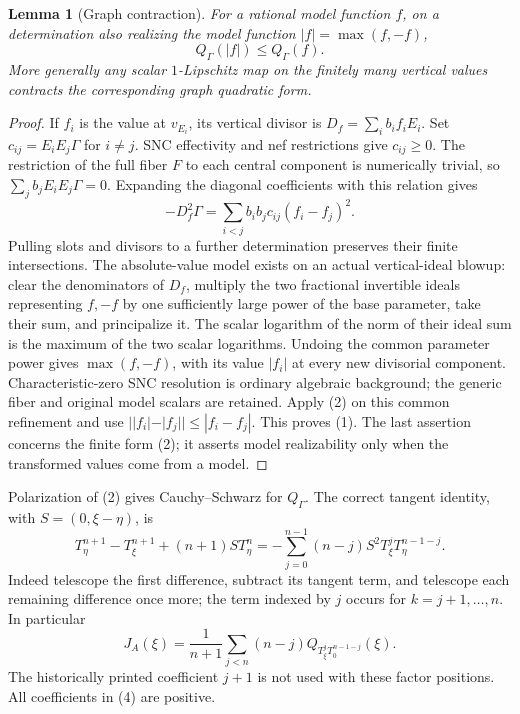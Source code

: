 \documentclass[11pt]{article}
\newtheorem{lemma}[theorem]{Lemma}
\begin{document}
\begin{lemma}[Graph contraction]\label{graph}
For a rational model function $f$, on a determination also realizing
the model function $|f|=\max(f,-f)$,
\[
 Q_\Gamma(|f|)\leq Q_\Gamma(f).                            \tag{1}
\]
More generally any scalar $1$-Lipschitz map on the finitely many
vertical values contracts the corresponding graph quadratic form.
\end{lemma}
\begin{proof}
If $f_i$ is the value at $v_{E_i}$, its vertical divisor is
$D_f=\sum_i b_if_iE_i$. Set $c_{ij}=E_iE_j\Gamma$ for $i\ne j$.
SNC effectivity and nef restrictions give $c_{ij}\geq0$.
The restriction of the full fiber $F$ to each central component is
numerically trivial, so $\sum_j b_jE_iE_j\Gamma=0$.
Expanding the diagonal coefficients with this relation gives
\[
 -D_f^2\Gamma=\sum_{i<j}b_ib_jc_{ij}(f_i-f_j)^2.            \tag{2}
\]
Pulling slots and divisors to a further determination preserves
their finite intersections. The absolute-value model exists on an
actual vertical-ideal blowup: clear the denominators of $D_f$,
multiply the two fractional invertible ideals representing $f,-f$
by one sufficiently large power of the base parameter, take their
sum, and principalize it. The scalar logarithm of the norm of their
ideal sum is the maximum of the two scalar logarithms. Undoing the common parameter power
gives $\max(f,-f)$, with its value $|f_i|$ at every new divisorial
component. Characteristic-zero SNC resolution is ordinary algebraic
background; the generic fiber and original model scalars are retained.
Apply (2) on this common refinement and use
$||f_i|-|f_j||\leq|f_i-f_j|$. This proves (1).
The last assertion concerns the finite form (2); it asserts model
realizability only when the transformed values come from a model.
\end{proof}

Polarization of (2) gives Cauchy--Schwarz for $Q_\Gamma$.
The correct tangent identity, with $S=(0,\xi-\eta)$, is
\[
 T_\eta^{n+1}-T_\xi^{n+1}+(n+1)ST_\eta^n
 =-\sum_{j=0}^{n-1}(n-j)S^2T_\xi^jT_\eta^{n-1-j}.          \tag{3}
\]
Indeed telescope the first difference, subtract its tangent term,
and telescope each remaining difference once more; the term indexed
by $j$ occurs for $k=j+1,\ldots,n$.
In particular
\[
 J_A(\xi)=\frac1{n+1}\sum_{j<n}(n-j)
                     Q_{T_\xi^jT_0^{n-1-j}}(\xi).         \tag{4}
\]
The historically printed coefficient $j+1$ is not used with these
factor positions. All coefficients in (4) are positive.
\end{document}
